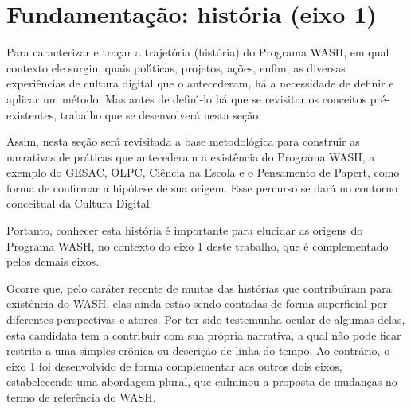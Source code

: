 \documentclass[
12pt,		%
openright,	%
twoside,  %
a4paper,			%
chapter=TITLE,		%
english,			%
french,				%
spanish,			%
brazil				%
]{USPSC-classe/USPSC}
\begin{document}
\section[Fundamenta\c{c}\~ao: hist\'oria (eixo 1)]{Fundamenta\c{c}\~ao: hist\'oria (eixo 1)}\label{Fundamenta\c{c}\~ao: hist\'oria (eixo 1)}
Para caracterizar e tra\c{c}ar a trajet\'oria (hist\'oria) do Programa WASH, em qual contexto ele surgiu, quais pol\'{\i}ticas, projetos, a\c{c}\~oes, enfim, as diversas experi\^encias de cultura digital que o antecederam, h\'a a necessidade de definir e aplicar um m\'etodo. Mas antes de defin\'{\i}-lo h\'a que se revisitar os conceitos pr\'e-existentes, trabalho que se desenvolver\'a nesta se\c{c}\~ao.










Assim, nesta se\c{c}\~ao ser\'a revisitada a base metodol\'ogica para construir as narrativas de pr\'aticas  que antecederam a exist\^encia do Programa WASH, a exemplo do GESAC, OLPC, Ci\^encia na Escola e o Pensamento de Papert, como forma de confirmar a hip\'otese de sua origem. Esse percurso se dar\'a no contorno conceitual da Cultura Digital.










Portanto, conhecer esta hist\'oria \'e importante para elucidar as origens do Programa WASH, no contexto do eixo 1 deste trabalho, que \'e complementado pelos demais eixos.










Ocorre que, pelo car\'ater recente de muitas das hist\'orias que contribu\'{\i}ram para exist\^encia do WASH, elas ainda est\~ao sendo contadas de forma superficial por diferentes perspectivas e atores. Por ter sido testemunha ocular de algumas delas, esta candidata tem a contribuir com sua pr\'opria narrativa, a qual n\~ao pode ficar restrita a uma simples cr\^onica ou descri\c{c}\~ao de linha do tempo. Ao contr\'ario, o eixo 1 foi desenvolvido de forma complementar aos outros dois eixos, estabelecendo uma abordagem plural, que culminou a proposta de mudan\c{c}as no termo de refer\^encia do WASH.
\end{document}
